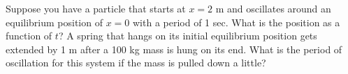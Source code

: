 \documentclass[12pt]{article}
\begin{document}
\pagestyle{empty}
\noindent Suppose you have a particle that starts at $x=2$ m and oscillates around an equilibrium position of $x=0$ with a period of 1 sec.  What is the position as a function of $t$?
\newpage
\noindent A spring that hangs on its initial equilibrium position gets extended by 1 m after a 100 kg mass is hung on its end. What is the period of oscillation for this system if the mass is pulled down a little? 
\end{document}
